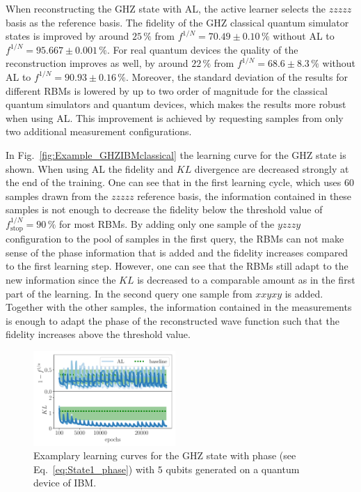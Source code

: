 \documentclass[pra,aps,showpacs,groupedaddress,superscriptaddress,twocolumn,toc=flat,biblatex,footinbib]{revtex4-1}
\begin{document}

When reconstructing the GHZ state with AL, the active learner selects the $zzzzz$ basis as the reference basis. The fidelity of the GHZ classical quantum simulator states is improved by around $25\,\%$ from $f^{1/N}=70.49\pm0.10\,\%$ without AL to $f^{1/N}=95.667\pm0.001\,\%$. For real quantum devices the quality of the reconstruction improves as well, by around $22\,\%$ from $f^{1/N}=68.6\pm8.3\,\%$ without AL to $f^{1/N}=90.93\pm0.16\,\%$. Moreover, the standard deviation of the results for different RBMs is lowered by up to two order of magnitude for the classical quantum simulators and quantum devices, which makes the results more robust when using AL. This improvement is achieved by requesting samples from only two additional measurement configurations.

In Fig.~\ref{fig:Example_GHZIBMclassical} the learning curve for the GHZ state is shown. When using AL the fidelity and $KL$ divergence are decreased strongly at the end of the training. One can see that in the first learning cycle, which uses $60$ samples drawn from the $zzzzz$ reference basis, the information contained in these samples is not enough to decrease the fidelity below the threshold value of $f^{1/N}_{\mathrm{stop}}=90\,\%$ for most RBMs. By adding only one sample of the $yzzzy$ configuration to the pool of samples in the first query, the RBMs can not make sense of the phase information that is added and the fidelity increases compared to the first learning step. However, one can see that the RBMs still adapt to the new information since the $KL$ is decreased to a comparable amount as in the first part of the learning. In the second query one sample from $xxyxy$ is added. Together with the other samples, the information contained in the measurements is enough to adapt the phase of the reconstructed wave function such that  the fidelity increases above the threshold value. \\

\begin{figure}[t]
	\centering
  \includegraphics[width=0.48\textwidth]{Fig4c.pdf}
	\caption[]{Examplary learning curves for the GHZ state with phase (see Eq.~\eqref{eq:State1_phase}) with $5$ qubits generated on a quantum device of IBM.}
	\label{fig:Example_GHZphase_IBMquantum}
\end{figure}
\end{document}
